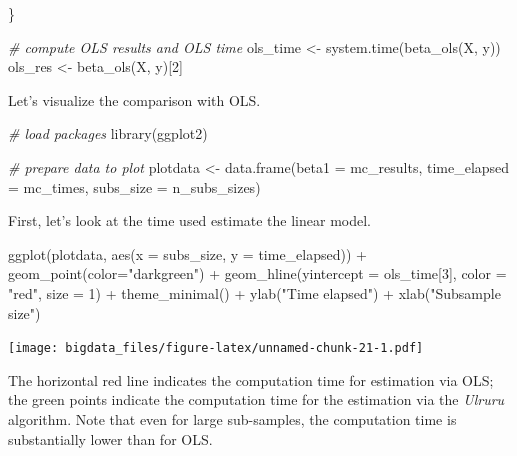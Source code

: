 \documentclass[
  12pt,
]{style/krantz}
\newenvironment{Shaded}{\begin{snugshade}}{\end{snugshade}}
\newcommand{\AttributeTok}[1]{\textcolor[rgb]{0.77,0.63,0.00}{#1}}
\newcommand{\CommentTok}[1]{\textcolor[rgb]{0.56,0.35,0.01}{\textit{#1}}}
\newcommand{\DecValTok}[1]{\textcolor[rgb]{0.00,0.00,0.81}{#1}}
\newcommand{\FunctionTok}[1]{\textcolor[rgb]{0.00,0.00,0.00}{#1}}
\newcommand{\NormalTok}[1]{#1}
\newcommand{\OtherTok}[1]{\textcolor[rgb]{0.56,0.35,0.01}{#1}}
\newcommand{\SpecialCharTok}[1]{\textcolor[rgb]{0.00,0.00,0.00}{#1}}
\newcommand{\StringTok}[1]{\textcolor[rgb]{0.31,0.60,0.02}{#1}}
\begin{document}
\begin{Shaded}
\begin{Highlighting}[]
\NormalTok{\}}

\CommentTok{\# compute OLS results and OLS time}
\NormalTok{ols\_time }\OtherTok{\textless{}{-}} \FunctionTok{system.time}\NormalTok{(}\FunctionTok{beta\_ols}\NormalTok{(X, y))}
\NormalTok{ols\_res }\OtherTok{\textless{}{-}} \FunctionTok{beta\_ols}\NormalTok{(X, y)[}\DecValTok{2}\NormalTok{]}
\end{Highlighting}
\end{Shaded}

Let's visualize the comparison with OLS.

\begin{Shaded}
\begin{Highlighting}[]
\CommentTok{\# load packages}
\FunctionTok{library}\NormalTok{(ggplot2)}

\CommentTok{\# prepare data to plot}
\NormalTok{plotdata }\OtherTok{\textless{}{-}} \FunctionTok{data.frame}\NormalTok{(}\AttributeTok{beta1 =}\NormalTok{ mc\_results,}
                       \AttributeTok{time\_elapsed =}\NormalTok{ mc\_times,}
                       \AttributeTok{subs\_size =}\NormalTok{ n\_subs\_sizes)}
\end{Highlighting}
\end{Shaded}

First, let's look at the time used estimate the linear model.

\begin{Shaded}
\begin{Highlighting}[]
\FunctionTok{ggplot}\NormalTok{(plotdata, }\FunctionTok{aes}\NormalTok{(}\AttributeTok{x =}\NormalTok{ subs\_size, }\AttributeTok{y =}\NormalTok{ time\_elapsed)) }\SpecialCharTok{+}
     \FunctionTok{geom\_point}\NormalTok{(}\AttributeTok{color=}\StringTok{"darkgreen"}\NormalTok{) }\SpecialCharTok{+} 
     \FunctionTok{geom\_hline}\NormalTok{(}\AttributeTok{yintercept =}\NormalTok{ ols\_time[}\DecValTok{3}\NormalTok{],}
                \AttributeTok{color =} \StringTok{"red"}\NormalTok{, }
                \AttributeTok{size =} \DecValTok{1}\NormalTok{) }\SpecialCharTok{+}
     \FunctionTok{theme\_minimal}\NormalTok{() }\SpecialCharTok{+}
     \FunctionTok{ylab}\NormalTok{(}\StringTok{"Time elapsed"}\NormalTok{) }\SpecialCharTok{+}
     \FunctionTok{xlab}\NormalTok{(}\StringTok{"Subsample size"}\NormalTok{)}
\end{Highlighting}
\end{Shaded}

\texttt{[image: bigdata\_files/figure-latex/unnamed-chunk-21-1.pdf]}

The horizontal red line indicates the computation time for estimation via OLS; the green points indicate the computation time for the estimation via the \emph{Ulruru} algorithm. Note that even for large sub-samples, the computation time is substantially lower than for OLS.
\end{document}
